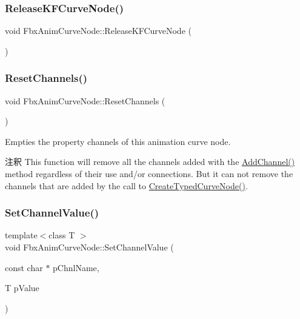 \subsubsection{\texorpdfstring{Release\+K\+F\+Curve\+Node()}{ReleaseKFCurveNode()}}
{\footnotesize\ttfamily void Fbx\+Anim\+Curve\+Node\+::\+Release\+K\+F\+Curve\+Node (\begin{DoxyParamCaption}{ }\end{DoxyParamCaption})}

\mbox{\label{class_fbx_anim_curve_node_ad334950a15167317fbbc029fe806976d}} 
\subsubsection{\texorpdfstring{Reset\+Channels()}{ResetChannels()}}
{\footnotesize\ttfamily void Fbx\+Anim\+Curve\+Node\+::\+Reset\+Channels (\begin{DoxyParamCaption}{ }\end{DoxyParamCaption})}

Empties the property channels of this animation curve node. \begin{DoxyRemark}{注釈}
This function will remove all the channels added with the \hyperlink{class_fbx_anim_curve_node_a985772edb8c85825adfef69c6bd06627}{Add\+Channel()} method regardless of their use and/or connections. But it can not remove the channels that are added by the call to \hyperlink{class_fbx_anim_curve_node_a588814e5973e080f84c54438623ddf7e}{Create\+Typed\+Curve\+Node()}. 
\end{DoxyRemark}
\mbox{\label{class_fbx_anim_curve_node_a0efefd96f733f636d7aa95148be08726}} 
\subsubsection{\texorpdfstring{Set\+Channel\+Value()}{SetChannelValue()}\hspace{0.1cm}{\footnotesize\ttfamily [1/2]}}
{\footnotesize\ttfamily template$<$class T $>$ \\
void Fbx\+Anim\+Curve\+Node\+::\+Set\+Channel\+Value (\begin{DoxyParamCaption}\item[{const char $\ast$}]{p\+Chnl\+Name,  }\item[{T}]{p\+Value }\end{DoxyParamCaption})}

